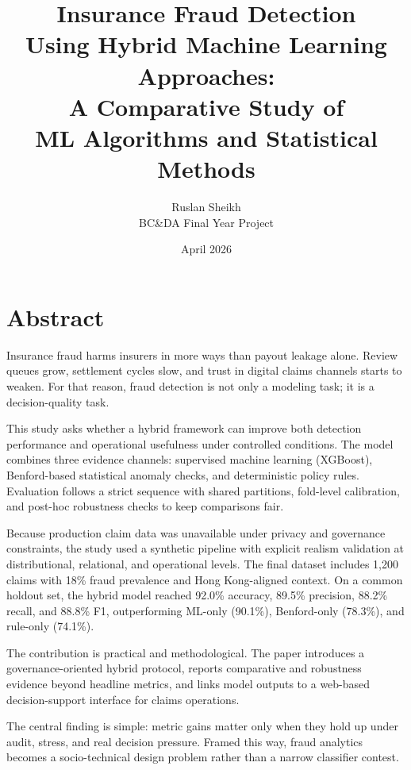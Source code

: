 \documentclass[12pt,a4paper]{report}
\title{\textbf{Insurance Fraud Detection\\Using Hybrid Machine Learning Approaches:}\\
A Comparative Study of\\ML Algorithms and Statistical Methods}
\author{Ruslan Sheikh\\
BC\&DA Final Year Project}
\date{April 2026}
\begin{document}
\setlength{\headheight}{15pt}
\pagestyle{fancy}
\fancyhf{}
\fancyhead[L]{\nouppercase{\leftmark}}
\fancyhead[R]{\thepage}
\renewcommand{\headrulewidth}{0.4pt}
\renewcommand{\footrulewidth}{0pt}

\maketitle

\chapter*{Abstract}
Insurance fraud harms insurers in more ways than payout leakage alone. Review queues grow, settlement cycles slow, and trust in digital claims channels starts to weaken. For that reason, fraud detection is not only a modeling task; it is a decision-quality task.

This study asks whether a hybrid framework can improve both detection performance and operational usefulness under controlled conditions. The model combines three evidence channels: supervised machine learning (XGBoost), Benford-based statistical anomaly checks, and deterministic policy rules. Evaluation follows a strict sequence with shared partitions, fold-level calibration, and post-hoc robustness checks to keep comparisons fair.

Because production claim data was unavailable under privacy and governance constraints, the study used a synthetic pipeline with explicit realism validation at distributional, relational, and operational levels. The final dataset includes 1,200 claims with 18\% fraud prevalence and Hong Kong-aligned context. On a common holdout set, the hybrid model reached 92.0\% accuracy, 89.5\% precision, 88.2\% recall, and 88.8\% F1, outperforming ML-only (90.1\%), Benford-only (78.3\%), and rule-only (74.1\%).

The contribution is practical and methodological. The paper introduces a governance-oriented hybrid protocol, reports comparative and robustness evidence beyond headline metrics, and links model outputs to a web-based decision-support interface for claims operations.

The central finding is simple: metric gains matter only when they hold up under audit, stress, and real decision pressure. Framed this way, fraud analytics becomes a socio-technical design problem rather than a narrow classifier contest.
\end{document}
